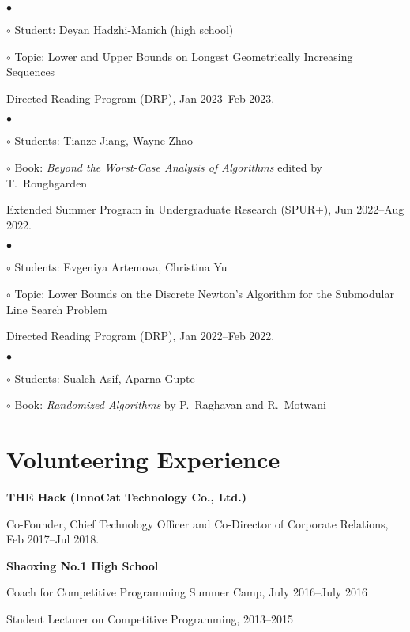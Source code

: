 \documentclass[margin,line]{res}
\newenvironment{list1}{
  \begin{list}{\ding{113}}{%
      \setlength{\itemsep}{0in}
      \setlength{\parsep}{0.025in} \setlength{\parskip}{0in}
      \setlength{\topsep}{0in} \setlength{\partopsep}{0in}
      \setlength{\leftmargin}{0.17in}}}{\end{list}}
\newenvironment{list2}{
  \begin{list}{$\bullet$}{%
      \setlength{\itemsep}{0in}
      \setlength{\parsep}{0in} \setlength{\parskip}{0in}
      \setlength{\topsep}{0in} \setlength{\partopsep}{0in}
      \setlength{\leftmargin}{0.2in}}}{\end{list}}
\newenvironment{list3}{
  \begin{list}{\ding{113}}{%
      \setlength{\itemsep}{0.05in}
      \setlength{\parsep}{0.025in} \setlength{\parskip}{0in}
      \setlength{\topsep}{0in} \setlength{\partopsep}{0in}
      \setlength{\leftmargin}{0.17in}}}{\end{list}}
\begin{document}
\begin{resume}
\begin{list3}
  \begin{list2}
  \item[$\circ$] Student: Deyan Hadzhi-Manich (high school)
  \item[$\circ$] Topic: Lower and Upper Bounds on Longest Geometrically Increasing Sequences
  \end{list2}
\item[] Directed Reading Program (DRP), Jan 2023--Feb 2023.
  \begin{list2}
  \item[$\circ$] Students: Tianze Jiang, Wayne Zhao
  \item[$\circ$] Book: \emph{Beyond the Worst-Case Analysis of Algorithms} edited by T.\ Roughgarden
  \end{list2}
\item[] Extended Summer Program in Undergraduate Research (SPUR+), Jun 2022--Aug 2022.
  \begin{list2}
  \item[$\circ$] Students: Evgeniya Artemova, Christina Yu
  \item[$\circ$] Topic: Lower Bounds on the Discrete Newton's Algorithm for the Submodular Line Search Problem
  \end{list2}
\item[] Directed Reading Program (DRP), Jan 2022--Feb 2022.
  \begin{list2}
  \item[$\circ$] Students: Sualeh Asif, Aparna Gupte
  \item[$\circ$] Book: \emph{Randomized Algorithms} by P.\ Raghavan and R.\ Motwani
  \end{list2}
\end{list3}

\section{\sc Volunteering Experience}

{\bf THE Hack (InnoCat Technology Co., Ltd.)}\\
\vspace*{-.1in}
\begin{list1}
\item[] Co-Founder, Chief Technology Officer and Co-Director of Corporate Relations, Feb 2017--Jul 2018.
\end{list1}

{\bf Shaoxing No.1 High School}\\
\vspace*{-.1in}
\begin{list1}
\item[] Coach for Competitive Programming Summer Camp, July 2016--July 2016
\item[] Student Lecturer on Competitive Programming, 2013--2015
\end{list1}



\end{resume}
\end{document}
